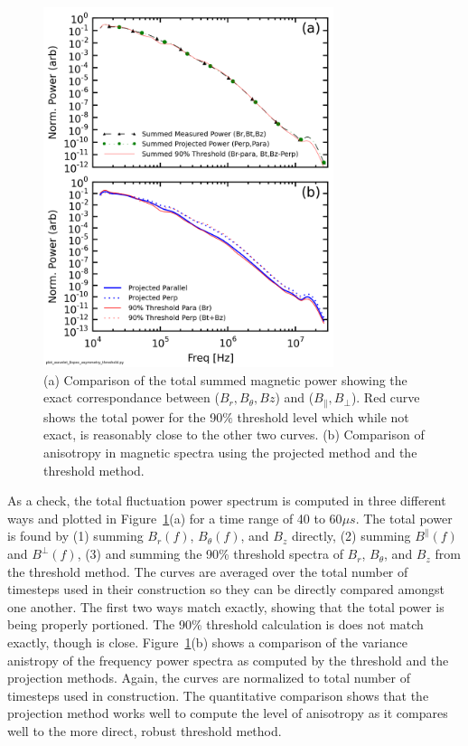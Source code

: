\documentclass[aip,prl,amsmath,amssymb,reprint,superscriptaddress]{revtex4-1} %
\begin{document}
\begin{figure}[!htbp]
\centerline{
\includegraphics[width=8.5cm]{Bperppara_spectra_thresholdvsprojection40t60us}}
\caption{\label{fig:powercomparison} (a) Comparison of the total summed magnetic power showing the exact correspondance between ($B_{r},B_{\theta},B{z}$) and ($B_{\parallel},B_{\perp}$). Red curve shows the total power for the 90$\%$ threshold level which while not exact, is reasonably close to the other two curves. (b) Comparison of anisotropy in magnetic spectra using the projected method and the threshold method.}
\end{figure}

As a check, the total fluctuation power spectrum is computed in three different ways and plotted in Figure~\ref{fig:powercomparison}(a) for a time range of 40 to 60$\mu s$. The total power is found by (1) summing $B_{r}(f)$, $B_{\theta}(f)$, and $B_{z}$ directly, (2) summing $B^{\parallel}(f)$ and $B^{\perp}(f)$, (3) and summing the 90\% threshold spectra of $B_{r}$, $B_{\theta}$, and $B_{z}$ from the threshold method. The curves are averaged over the total number of timesteps used in their construction so they can be directly compared amongst one another. The first two ways match exactly, showing that the total power is being properly portioned. The 90\% threshold calculation is does not match exactly, though is close. Figure~\ref{fig:powercomparison}(b) shows a comparison of the variance anistropy of the frequency power spectra as computed by the threshold and the projection methods. Again, the curves are normalized to total number of timesteps used in construction. The quantitative comparison shows that the projection method works well to compute the level of anisotropy as it compares well to the more direct, robust threshold method.
\end{document}
